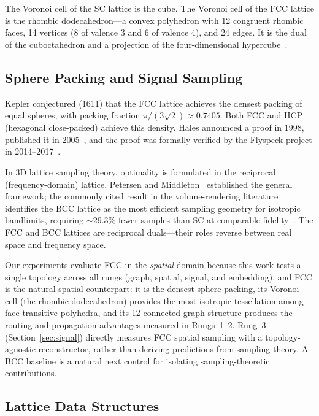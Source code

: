 \documentclass[11pt]{article}
\begin{document}
The Voronoi cell of the SC lattice is the cube. The Voronoi cell
of the FCC lattice is the rhombic dodecahedron---a convex polyhedron
with 12 congruent rhombic faces, 14 vertices (8 of valence 3 and
6 of valence 4), and 24 edges. It is the dual of the cuboctahedron
and a projection of the four-dimensional
hypercube~\cite{coxeter1973}.

\subsection{Sphere Packing and Signal Sampling}

Kepler conjectured (1611) that the FCC lattice achieves the densest
packing of equal spheres, with packing fraction
$\pi/(3\sqrt{2}) \approx 0.7405$. Both FCC and HCP (hexagonal
close-packed) achieve this density. Hales announced a proof in
1998, published it in 2005~\cite{hales2005}, and the proof was
formally verified by the Flyspeck project in
2014--2017~\cite{hales2017}.

In 3D lattice sampling theory, optimality is formulated in the
reciprocal (frequency-domain) lattice. Petersen and
Middleton~\cite{petersen1962} established the general framework;
the commonly cited result in the volume-rendering literature
identifies the BCC lattice as the most efficient sampling geometry
for isotropic bandlimits, requiring ${\sim}29.3\%$ fewer samples
than SC at comparable fidelity~\cite{theussl2002orvs,theussl2001}.
The FCC and BCC lattices are reciprocal duals---their roles
reverse between real space and frequency space.

Our experiments evaluate FCC in the \emph{spatial} domain because
this work tests a single topology across all rungs (graph,
spatial, signal, and embedding), and FCC is the natural spatial
counterpart: it is the densest sphere packing, its Voronoi cell
(the rhombic dodecahedron) provides the most isotropic
tessellation among face-transitive polyhedra, and its 12-connected
graph structure produces the routing and propagation advantages
measured in Rungs~1--2. Rung~3 (Section~\ref{sec:signal})
directly measures FCC spatial sampling with a topology-agnostic
reconstructor, rather than deriving predictions from sampling
theory. A BCC baseline is a natural next control for isolating
sampling-theoretic contributions.

\subsection{Lattice Data Structures}
\end{document}
